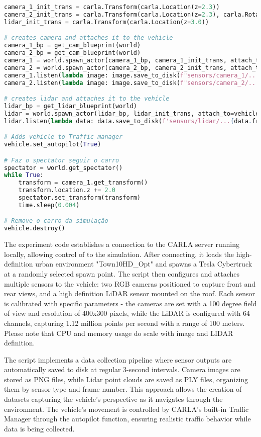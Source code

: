 \begin{lstlisting}[language=Python, caption={Basic starting code for a simple data collection example, using a single vehicle mounted with 2 cameras and a lidar sensor},label={code:starting}]
camera_1_init_trans = carla.Transform(carla.Location(z=2.3))
camera_2_init_trans = carla.Transform(carla.Location(z=2.3), carla.Rotation(yaw=180))
lidar_init_trans = carla.Transform(carla.Location(z=3.0))

# creates camera and attaches it to the vehicle
camera_1_bp = get_cam_blueprint(world)
camera_2_bp = get_cam_blueprint(world)
camera_1 = world.spawn_actor(camera_1_bp, camera_1_init_trans, attach_to=vehicle)
camera_2 = world.spawn_actor(camera_2_bp, camera_2_init_trans, attach_to=vehicle)
camera_1.listen(lambda image: image.save_to_disk(f"sensors/camera_1/...{image.frame}.png"))
camera_2.listen(lambda image: image.save_to_disk(f"sensors/camera_2/...{image.frame}.png"))

# creates lidar and attaches it to the vehicle
lidar_bp = get_lidar_blueprint(world)
lidar = world.spawn_actor(lidar_bp, lidar_init_trans, attach_to=vehicle)
lidar.listen(lambda data: data.save_to_disk(f'sensors/lidar/...{data.frame}.ply'))

# Adds vehicle to Traffic manager
vehicle.set_autopilot(True)

# Faz o spectator seguir o carro
spectator = world.get_spectator()
while True:
    transform = camera_1.get_transform()
    transform.location.z += 2.0
    spectator.set_transform(transform)
    time.sleep(0.004)

# Remove o carro da simulação
vehicle.destroy()
\end{lstlisting}

The experiment code establishes a connection to the CARLA server running locally, allowing control of to the simulation. After connecting, it loads the high-definition urban environment "Town10HD\_Opt" and spawns a Tesla Cybertruck at a randomly selected spawn point. The script then configures and attaches multiple sensors to the vehicle: two RGB cameras positioned to capture front and rear views, and a high definition LiDAR sensor mounted on the roof. Each sensor is calibrated with specific parameters - the cameras are set with a 100 degree field of view and resolution of 400x300 pixels, while the LiDAR is configured with 64 channels, capturing 1.12 million points per second with a range of 100 meters. Please note that CPU and memory usage do scale with image and LIDAR definition.

The script implements a data collection pipeline where sensor outputs are automatically saved to disk at regular 3-second intervals. Camera images are stored as PNG files, while Lidar point clouds are saved as PLY files, organizing them by sensor type and frame number. This approach allows the creation of datasets capturing the vehicle's perspective as it navigates through the environment. The vehicle's movement is controlled by CARLA's built-in Traffic Manager through the autopilot function, ensuring realistic traffic behavior while data is being collected.

